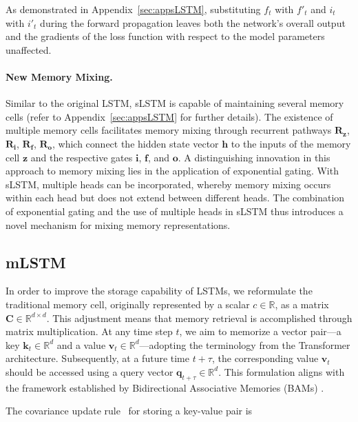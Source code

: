 As demonstrated in Appendix~\ref{sec:appsLSTM}, substituting $f_t$ with $f'_t$ and $i_t$ with $i'_t$ during the forward propagation leaves both the network's overall output and the gradients of the loss function with respect to the model parameters unaffected.

\paragraph{New Memory Mixing.} Similar to the original LSTM, sLSTM is capable of maintaining several memory cells (refer to Appendix~\ref{sec:appsLSTM} for further details). The existence of multiple memory cells facilitates memory mixing through recurrent pathways $\mathbf{R}_{\mathbf{z}}$, $\mathbf{R}_{\mathbf{i}}$, $\mathbf{R}_{\mathbf{f}}$, $\mathbf{R}_{\mathbf{o}}$, which connect the hidden state vector $\mathbf{h}$ to the inputs of the memory cell $\mathbf{z}$ and the respective gates $\mathbf{i}$, $\mathbf{f}$, and $\mathbf{o}$. A distinguishing innovation in this approach to memory mixing lies in the application of exponential gating. With sLSTM, multiple heads can be incorporated, whereby memory mixing occurs within each head but does not extend between different heads. The combination of exponential gating and the use of multiple heads in sLSTM thus introduces a novel mechanism for mixing memory representations.

\subsection{mLSTM}
\label{sec:mLSTM}

In order to improve the storage capability of LSTMs, we reformulate the traditional memory cell, originally represented by a scalar $c \in \mathbb{R}$, as a matrix $\mathbf{C} \in \mathbb{R}^{d \times d}$. This adjustment means that memory retrieval is accomplished through matrix multiplication. At any time step $t$, we aim to memorize a vector pair—a key $\mathbf{k}_t \in \mathbb{R}^d$ and a value $\mathbf{v}_t \in \mathbb{R}^d$—adopting the terminology from the Transformer architecture. Subsequently, at a future time $t + \tau$, the corresponding value $\mathbf{v}_t$ should be accessed using a query vector $\mathbf{q}_{t+\tau} \in \mathbb{R}^d$. This formulation aligns with the framework established by Bidirectional Associative Memories (BAMs) \citep{Kohonen:72,Anderson:72,Nakano:72,Anderson:77}.

The covariance update rule~\citep{Sejnowski:77,Dayan:91} for storing a key-value pair is

